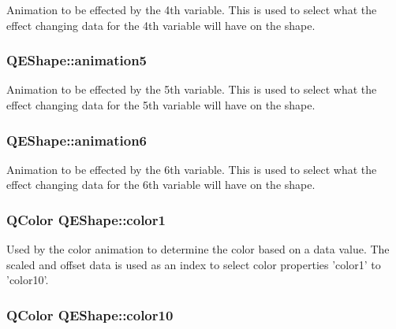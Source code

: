 \label{classQEShape_a3f7804fddb5349f7a53f9deeeb400ef3}
Animation to be effected by the 4th variable. This is used to select what the effect changing data for the 4th variable will have on the shape. \hypertarget{classQEShape_a73f0ef27b10cb91ecf0cbd98cbfdb5eb}{
\subsubsection[{animation5}]{ QEShape::animation5}}
\label{classQEShape_a73f0ef27b10cb91ecf0cbd98cbfdb5eb}
Animation to be effected by the 5th variable. This is used to select what the effect changing data for the 5th variable will have on the shape. \hypertarget{classQEShape_a83b448c89d2cc9181c0fc91a795896ee}{
\subsubsection[{animation6}]{ QEShape::animation6}}
\label{classQEShape_a83b448c89d2cc9181c0fc91a795896ee}
Animation to be effected by the 6th variable. This is used to select what the effect changing data for the 6th variable will have on the shape. \hypertarget{classQEShape_ae2ec6b8b11786ae2f4db555e08c9c674}{
\subsubsection[{color1}]{\setlength{\rightskip}{0pt plus 5cm}QColor QEShape::color1}}
\label{classQEShape_ae2ec6b8b11786ae2f4db555e08c9c674}
Used by the color animation to determine the color based on a data value. The scaled and offset data is used as an index to select color properties 'color1' to 'color10'. \hypertarget{classQEShape_a4f5c3588b67f1a3d5e13b96b1d80a128}{
\subsubsection[{color10}]{\setlength{\rightskip}{0pt plus 5cm}QColor QEShape::color10}}
